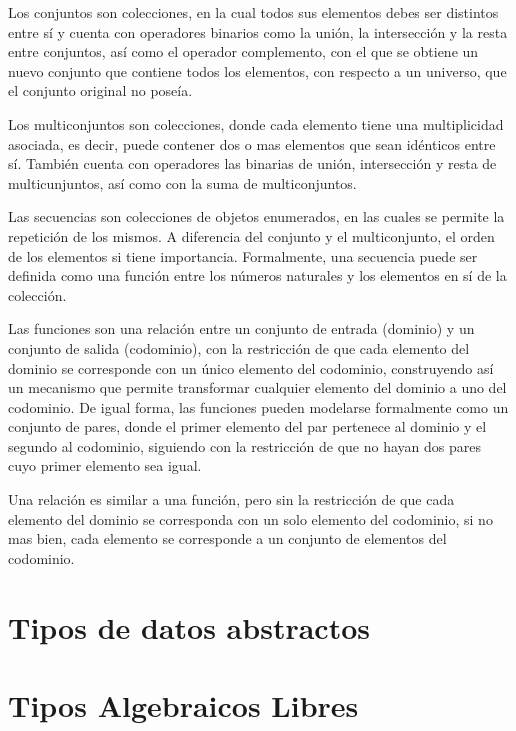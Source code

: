 \begin{enumerate}[label=\emph{}]
  Los conjuntos son colecciones, en la cual todos sus
 elementos debes ser distintos entre sí y cuenta con operadores binarios como
 la unión, la intersección y la resta entre conjuntos, así como el operador
 complemento, con el que se obtiene un nuevo conjunto que contiene todos los
 elementos, con respecto a un universo, que el conjunto original no poseía.

  Los multiconjuntos son colecciones, donde cada elemento
 tiene una multiplicidad asociada, es decir, puede contener dos o mas elementos
 que sean idénticos entre sí. También cuenta con operadores las binarias de unión,
 intersección y resta de multicunjuntos, así como con la suma de
 multiconjuntos.

  Las secuencias son colecciones de objetos enumerados, en las cuales
 se permite la repetición de los mismos. A diferencia del conjunto y el
 multiconjunto, el orden de los elementos si tiene importancia. Formalmente,
 una secuencia puede ser definida como una función entre los números naturales
 y los elementos en sí de la colección. 

  Las funciones son una relación entre un conjunto de entrada (dominio) y
 un conjunto de salida (codominio), con la restricción de que cada elemento
 del dominio se corresponde con un único elemento del codominio, construyendo
 así un mecanismo que permite transformar cualquier elemento del dominio a uno
 del codominio. De igual forma, las funciones pueden modelarse formalmente
 como un conjunto de pares, donde el primer elemento del par pertenece al
 dominio y el segundo al codominio, siguiendo con la restricción de que no
 hayan dos pares cuyo primer elemento sea igual.

  Una relación es similar a una función, pero sin la
 restricción de que cada elemento del dominio se corresponda con un solo
 elemento del codominio, si no mas bien, cada elemento se corresponde a un
 conjunto de elementos del codominio.

\end{enumerate}

\section{Tipos de datos abstractos}

\section{Tipos Algebraicos Libres}

